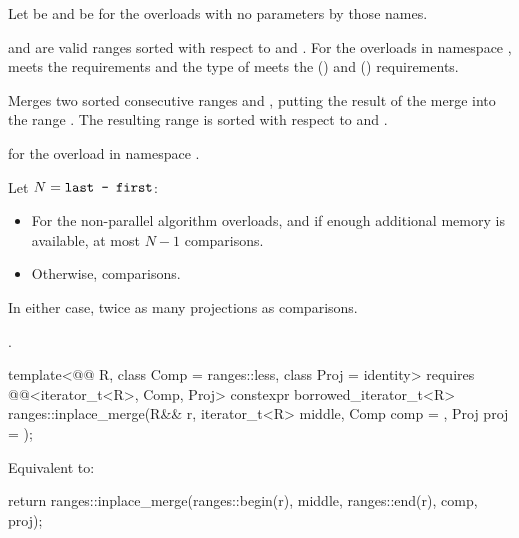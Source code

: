 \begin{itemdescr}
\pnum
Let  be 
and  be 
for the overloads with no parameters by those names.

\pnum
\expects
{} and  are valid ranges
sorted with respect to  and .
For the overloads in namespace ,
 meets
the  requirements and
the type of  meets
the  () and
 () requirements.

\pnum
\effects
Merges two sorted consecutive ranges
 and ,
putting the result of the merge into the range .
The resulting range is sorted with respect to  and .

\pnum
\returns
{} for the overload in namespace .

\pnum
\complexity
Let $N = \tcode{last - first}$:
\begin{itemize}
\item
  For the non-parallel algorithm overloads, and
  if enough additional memory is available, at most $N - 1$ comparisons.
\item
  Otherwise,  comparisons.
\end{itemize}
In either case, twice as many projections as comparisons.

\pnum
\remarks
{}.
\end{itemdescr}

\begin{itemdecl}
template<@@ R, class Comp = ranges::less, class Proj = identity>
  requires @@<iterator_t<R>, Comp, Proj>
  constexpr borrowed_iterator_t<R>
    ranges::inplace_merge(R&& r, iterator_t<R> middle, Comp comp = {}, Proj proj = {});
\end{itemdecl}

\begin{itemdescr}
\pnum
\effects
Equivalent to:
\begin{codeblock}
return ranges::inplace_merge(ranges::begin(r), middle, ranges::end(r), comp, proj);
\end{codeblock}
\end{itemdescr}

